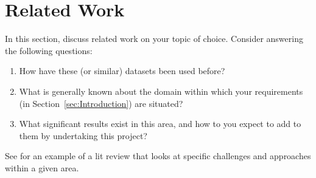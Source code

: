 \section{Related Work}
\label{sec:rw}

In this section, discuss related work on your topic of choice. Consider answering the following questions:

\begin{enumerate}[label=Q\arabic*]
\item How have these (or similar) datasets been used before?
\item What is generally known about the domain within which your requirements (in Section~\ref{sec:Introduction}) are situated?
\item What significant results exist in this area, and how to you expect to add to them by undertaking this project?
\end{enumerate}

See \cite{hall2018editorial} for an example of a lit review that looks at specific challenges and approaches within a given area.